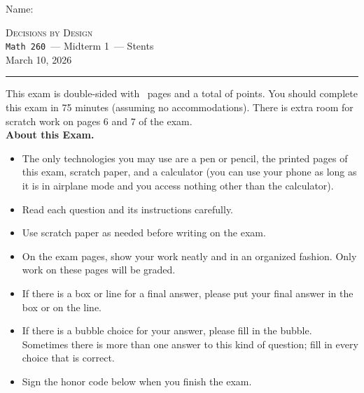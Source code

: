 \documentclass[12pt,addpoints]{exam}
\newcommand{\coursename}{Decisions by Design}
\newcommand{\coursenumber}{{\tt Math 260}}
\newcommand{\examname}{Midterm 1}
\newcommand{\examdate}{March 10, 2026}
\begin{document}
\thispagestyle{empty}
\noindent Name: \hrulefill\\[1em]


\bigskip

\noindent\hrulefill
\bigskip
\begin{center}
\large \textsc{\coursename} \\
\smallskip
\normalsize \coursenumber\ --- \examname\ --- Stents\\
\smallskip
\examdate
\end{center}
\bigskip
\hrule


\vspace{20pt}

\noindent This exam is double-sided with \numpages\ pages and a total of  points. You should complete this exam in 75 minutes (assuming no accommodations). There is extra room for scratch work on pages 6 and 7 of the exam.\\



\noindent \textbf{About this Exam.}
\begin{itemize}
  \setlength{\itemindent}{-1em}
  \item The only technologies you may use are a pen or pencil, the printed pages of this exam, scratch paper, and a calculator (you can use your phone as long as it is in airplane mode and you access nothing other than the calculator).
	\item Read each question and its instructions carefully.
	\item Use scratch paper as needed before writing on the exam.
	\item On the exam pages, show your work neatly and in an organized fashion. Only work on these pages will be graded.
	\item If there is a box or line for a final answer, please put your final answer in the box or on the line.
	\item If there is a bubble choice for your answer, please fill in the bubble. Sometimes there is more than one answer to this kind of question; fill in every choice that is correct.
  \item Sign the honor code below when you finish the exam.
\end{itemize} 
\end{document}
